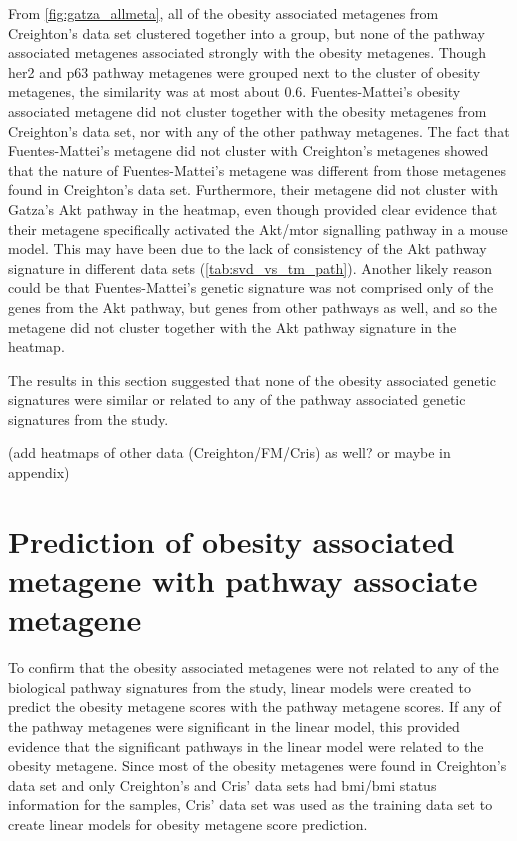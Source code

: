 From \cref{fig:gatza_allmeta}, all of the obesity associated metagenes from Creighton's data set clustered together into a group, but none of the pathway associated metagenes associated strongly with the obesity metagenes.
Though \gls{her2} and p63 pathway metagenes were grouped next to the cluster of obesity metagenes, the similarity was at most about 0.6.
Fuentes-Mattei's obesity associated metagene did not cluster together with the obesity metagenes from Creighton's data set, nor with any of the other pathway metagenes.
The fact that Fuentes-Mattei's metagene did not cluster with Creighton's metagenes showed that the nature of Fuentes-Mattei's metagene was different from those metagenes found in Creighton's data set.
Furthermore, their metagene did not cluster with Gatza's Akt pathway in the heatmap, even though \citet{Fuentes-Mattei2014} provided clear evidence that their metagene specifically activated the Akt/\gls{mtor} signalling pathway in a mouse model.
This may have been due to the lack of consistency of the Akt pathway signature in different data sets (\cref{tab:svd_vs_tm_path}).
Another likely reason could be that Fuentes-Mattei's genetic signature was not comprised only of the genes from the Akt pathway, but genes from other pathways as well, and so the metagene did not cluster together with the Akt pathway signature in the heatmap.

The results in this section suggested that none of the obesity associated genetic signatures were similar or related to any of the pathway associated genetic signatures from the \citet{Gatza2010a} study.

(add heatmaps of other data (Creighton/FM/Cris) as well? or maybe in appendix)

\section{Prediction of obesity associated metagene with pathway associate metagene}
\label{sec:prediction_of_obesity_associated_metagene_with_pathway_associate_metagene}


To confirm that the obesity associated metagenes were not related to any of the biological pathway signatures from the \citet{Gatza2010a} study, linear models were created to predict the obesity metagene scores with the pathway metagene scores.
If any of the pathway metagenes were significant in the linear model, this provided evidence that the significant pathways in the linear model were related to the obesity metagene.
Since most of the obesity metagenes were found in Creighton's data set and only Creighton's and Cris' data sets had \gls{bmi}/\gls{bmi} status information for the samples, Cris' data set was used as the training data set to create linear models for obesity metagene score prediction.

